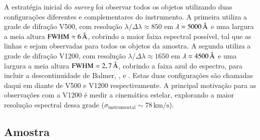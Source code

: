 
A estratégia inicial do {\em survey} foi observar todos os objetos utilizando
duas configurações diferentes e complementares do instrumento. A primeira
utiliza a grade de difração V500, com resolução $\lambda / \Delta\lambda \approx
850$ em $\lambda = 5000\,\text{\normalfont\AA}$ e uma largura a meia altura $\mathrm{FWHM}
\approx 6\,\text{\normalfont\AA}$, cobrindo a maior faixa espectral possível, tal que as
linhas \OII e \SII sejam observadas para todos os objetos da amostra.
A segunda utiliza a grade de difração V1200, com resolução $\lambda /
\Delta\lambda \approx 1650$ em $\lambda = 4500\,\text{\normalfont\AA}$ e uma largura a meia
altura $\mathrm{FWHM} \approx 2,7\,\text{\normalfont\AA}$, cobrindo a faixa azul do
espectro, para incluir a descontinuidade de Balmer, \Hdelta, \Hgamma e
.
Estas duas configurações são chamadas daqui em diante de V500 e V1200
respectivamente. A principal motivação para as observações com a V1200 é medir a
cinemática estelar, explorando a maior resolução espectral dessa grade
($\sigma_{\mathrm{instrumental}} \sim 78\, \mathrm{km}/\mathrm{s}$).


\subsection{Amostra}



